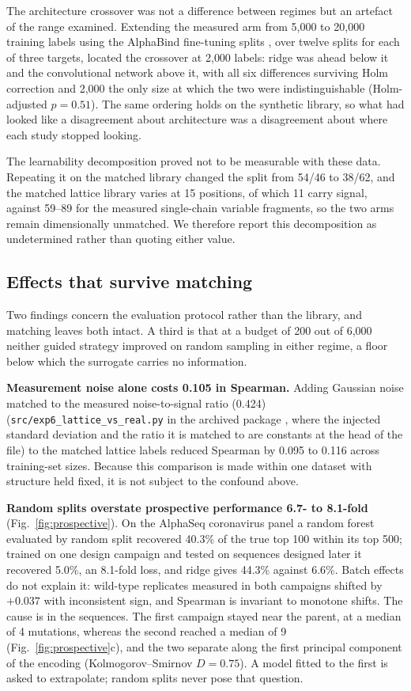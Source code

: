 \documentclass[pdflatex,sn-nature]{sn-jnl}
\theoremstyle{thmstyleone}
\theoremstyle{thmstyletwo}
\theoremstyle{thmstylethree}
\begin{document}
The architecture crossover was not a difference between regimes but an artefact
of the range examined. Extending the measured arm from 5{,}000 to 20{,}000
training labels using the AlphaBind fine-tuning splits \cite{alphabind2025},
over twelve splits for each of three targets, located the crossover at 2{,}000
labels: ridge was ahead below it and the convolutional network above it, with
all six differences surviving Holm correction and 2{,}000 the only size at
which the two were indistinguishable (Holm-adjusted $p = 0.51$). The same
ordering holds on the synthetic library, so what had looked like a disagreement
about architecture was a disagreement about where each study stopped looking.

The learnability decomposition proved not to be measurable with these data.
Repeating it on the matched library changed the split from 54/46 to 38/62,
and the matched lattice library varies at 15 positions, of which 11 carry
signal, against 59--89 for the measured single-chain variable fragments, so the
two arms remain dimensionally unmatched. We therefore report this decomposition as
undetermined rather than quoting either value.

\subsection*{Effects that survive matching}

Two findings concern the evaluation protocol rather than the library, and
matching leaves both intact. A third is that at a budget of 200 out of 6{,}000
neither guided strategy improved on random sampling in either regime, a floor
below which the surrogate carries no information.

\textbf{Measurement noise alone costs 0.105 in Spearman.} Adding Gaussian noise
matched to the measured noise-to-signal ratio (0.424)
(\texttt{src/exp6\_lattice\_vs\_real.py} in the archived package
\cite{libmatch2026}, where the injected standard deviation and the ratio it is
matched to are constants at the head of the file) to the matched lattice
labels reduced Spearman by 0.095 to 0.116 across training-set sizes. Because
this comparison is made within one dataset with structure held fixed, it is not
subject to the confound above.

\textbf{Random splits overstate prospective performance 6.7- to 8.1-fold}
(Fig.~\ref{fig:prospective}). On the AlphaSeq coronavirus panel a random forest
evaluated by random split recovered 40.3\% of the true top 100 within its top
500; trained on one design campaign and tested on sequences designed later it
recovered 5.0\%, an 8.1-fold loss, and ridge gives 44.3\% against 6.6\%.
Batch effects do not explain it: wild-type replicates measured in both
campaigns shifted by $+0.037$ with inconsistent sign, and Spearman is invariant
to monotone shifts. The cause is in the sequences. The first campaign stayed
near the parent, at a median of 4 mutations, whereas the second reached a
median of 9 (Fig.~\ref{fig:prospective}c), and the two separate along the first
principal component of the encoding (Kolmogorov--Smirnov $D = 0.75$). A model
fitted to the first is asked to extrapolate; random splits never pose that
question.
\end{document}

